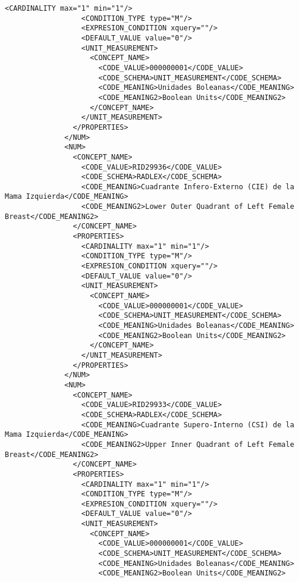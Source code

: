 \begin{lstlisting}[label=some-code,caption=Some Code]
                  <CARDINALITY max="1" min="1"/>
                  <CONDITION_TYPE type="M"/>
                  <EXPRESION_CONDITION xquery=""/>
                  <DEFAULT_VALUE value="0"/>
                  <UNIT_MEASUREMENT>
                    <CONCEPT_NAME>
                      <CODE_VALUE>000000001</CODE_VALUE>
                      <CODE_SCHEMA>UNIT_MEASUREMENT</CODE_SCHEMA>
                      <CODE_MEANING>Unidades Boleanas</CODE_MEANING>
                      <CODE_MEANING2>Boolean Units</CODE_MEANING2>
                    </CONCEPT_NAME>
                  </UNIT_MEASUREMENT>
                </PROPERTIES>
              </NUM>
              <NUM>
                <CONCEPT_NAME>
                  <CODE_VALUE>RID29936</CODE_VALUE>
                  <CODE_SCHEMA>RADLEX</CODE_SCHEMA>
                  <CODE_MEANING>Cuadrante Infero-Externo (CIE) de la Mama Izquierda</CODE_MEANING>
                  <CODE_MEANING2>Lower Outer Quadrant of Left Female Breast</CODE_MEANING2>
                </CONCEPT_NAME>
                <PROPERTIES>
                  <CARDINALITY max="1" min="1"/>
                  <CONDITION_TYPE type="M"/>
                  <EXPRESION_CONDITION xquery=""/>
                  <DEFAULT_VALUE value="0"/>
                  <UNIT_MEASUREMENT>
                    <CONCEPT_NAME>
                      <CODE_VALUE>000000001</CODE_VALUE>
                      <CODE_SCHEMA>UNIT_MEASUREMENT</CODE_SCHEMA>
                      <CODE_MEANING>Unidades Boleanas</CODE_MEANING>
                      <CODE_MEANING2>Boolean Units</CODE_MEANING2>
                    </CONCEPT_NAME>
                  </UNIT_MEASUREMENT>
                </PROPERTIES>
              </NUM>
              <NUM>
                <CONCEPT_NAME>
                  <CODE_VALUE>RID29933</CODE_VALUE>
                  <CODE_SCHEMA>RADLEX</CODE_SCHEMA>
                  <CODE_MEANING>Cuadrante Supero-Interno (CSI) de la Mama Izquierda</CODE_MEANING>
                  <CODE_MEANING2>Upper Inner Quadrant of Left Female Breast</CODE_MEANING2>
                </CONCEPT_NAME>
                <PROPERTIES>
                  <CARDINALITY max="1" min="1"/>
                  <CONDITION_TYPE type="M"/>
                  <EXPRESION_CONDITION xquery=""/>
                  <DEFAULT_VALUE value="0"/>
                  <UNIT_MEASUREMENT>
                    <CONCEPT_NAME>
                      <CODE_VALUE>000000001</CODE_VALUE>
                      <CODE_SCHEMA>UNIT_MEASUREMENT</CODE_SCHEMA>
                      <CODE_MEANING>Unidades Boleanas</CODE_MEANING>
                      <CODE_MEANING2>Boolean Units</CODE_MEANING2>

\end{lstlisting}
